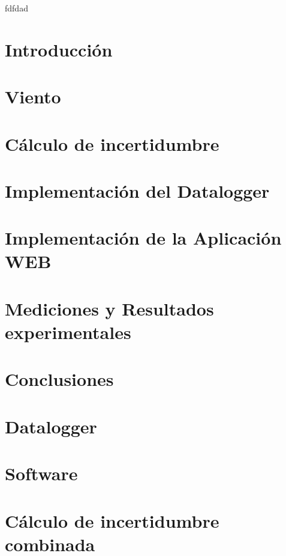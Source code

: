 \documentclass[11pt, a4paper,oneside]{book}
\begin{document}


\clearpage\hbox{}\thispagestyle{empty}\newpage

fdfdad
\clearpage\hbox{}\thispagestyle{empty}\newpage

\clearpage\hbox{}\thispagestyle{empty}\newpage

\clearpage\hbox{}\thispagestyle{empty}\newpage
\tableofcontents
\listoffigures
\listoftables
\newpage

\setcounter{page}{1}

\chapter{Introducción}\label{cap:introduccion}


\chapter{Viento}\label{cap:viento}

\chapter{Cálculo de incertidumbre}\label{cap:incertidumbre}

\chapter{Implementación del Datalogger}\label{cap:datalogger}

\chapter{Implementación de la Aplicación WEB}\label{cap:aplicacionweb}

\chapter{Mediciones y Resultados experimentales}\label{cap:med_result}



\chapter{Conclusiones}



\appendix
\chapter{Datalogger}

\chapter{Software}

\chapter{Cálculo de incertidumbre combinada}

\printbibliography



\end{document}

